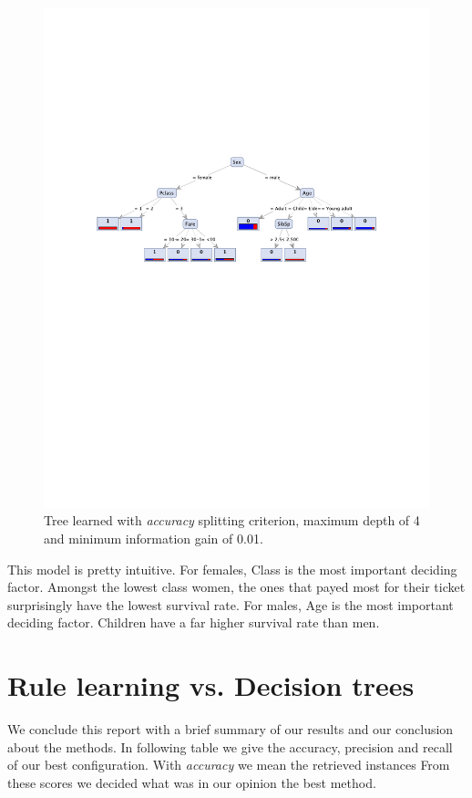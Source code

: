 \documentclass[12pt,a4paper]{article}
\begin{document}
\begin{figure}[htbp]
  \centering
  \includegraphics[width = .8\textwidth]{tree_final}
  \captionsetup{width=.8\textwidth}
  \caption{Tree learned with \emph{accuracy} splitting criterion, maximum depth of 4 and minimum information gain of 0.01.}
  \label{fig:tree_final}
\end{figure}
\par This model is pretty intuitive. For females, Class is the most important deciding factor. Amongst the lowest class women, the ones that payed most for their ticket surprisingly have the lowest survival rate. For males, Age is the most important deciding factor. Children have a far higher survival rate than men.
\pagebreak
\section{Rule learning vs. Decision trees}

We conclude this report with a brief summary of our results and our conclusion about the methods.
In following table we give the accuracy, precision and recall of our best configuration.
With \emph{accuracy} we mean the retrieved instances 
From these scores we decided what was in our opinion the best method.
\end{document}
